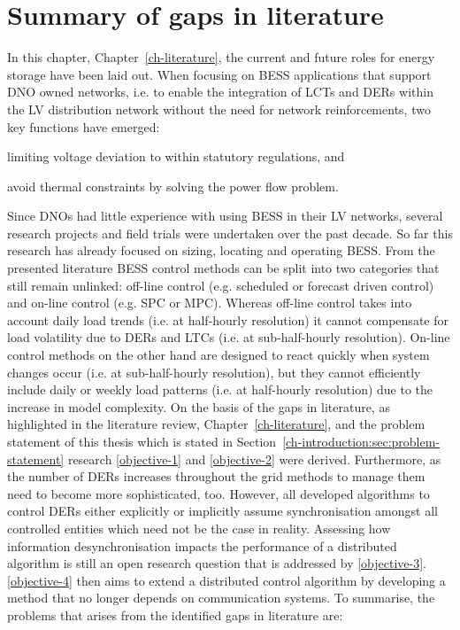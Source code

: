\section{Summary of gaps in literature}
\label{ch-literature:sec:literature-gaps}

In this chapter, Chapter~\ref{ch-literature}, the current and future roles for energy storage have been laid out.
When focusing on BESS applications that support DNO owned networks, i.e. to enable the integration of LCTs and DERs within the LV distribution network without the need for network reinforcements, two key functions have emerged:
\begin{enumerate*}
	\item limiting voltage deviation to within statutory regulations, and
	\item avoid thermal constraints by solving the power flow problem.
\end{enumerate*}
Since DNOs had little experience with using BESS in their LV networks, several research projects and field trials were undertaken over the past decade.
So far this research has already focused on sizing, locating and operating BESS.
From the presented literature BESS control methods can be split into two  categories that still remain unlinked: off-line control (e.g. scheduled or forecast driven control) and on-line control (e.g. SPC or MPC).
Whereas off-line control takes into account daily load trends (i.e. at half-hourly resolution) it cannot compensate for load volatility due to DERs and LTCs (i.e. at sub-half-hourly resolution).
On-line control methods on the other hand are designed to react quickly when system changes occur (i.e. at sub-half-hourly resolution), but they cannot efficiently include daily or weekly load patterns (i.e. at half-hourly resolution) due to the increase in model complexity.
On the basis of the gaps in literature, as highlighted in the literature review, Chapter~\ref{ch-literature}, and the problem statement of this thesis which is stated in Section~\ref{ch-introduction:sec:problem-statement} research \ref{objective-1} and \ref{objective-2} were derived.
Furthermore, as the number of DERs increases throughout the grid methods to manage them need to become more sophisticated, too.
However, all developed algorithms to control DERs either explicitly or implicitly assume synchronisation amongst all controlled entities which need not be the case in reality.
Assessing how information desynchronisation impacts the performance of a distributed algorithm is still an open research question that is addressed by \ref{objective-3}.
\ref{objective-4} then aims to extend a distributed control algorithm by developing a method that no longer depends on communication systems.
To summarise, the problems that arises from the identified gaps in literature are:

